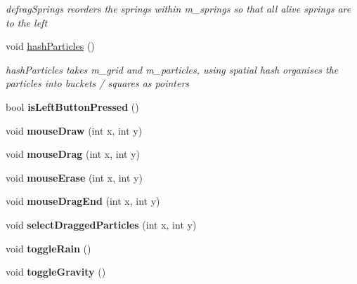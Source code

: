 \begin{DoxyCompactItemize}
\begin{DoxyCompactList}\small\item\em defrag\-Springs reorders the springs within m\-\_\-springs so that all alive springs are to the left \end{DoxyCompactList}\item 
\hypertarget{classWorld_ae27fe9607ae7b01b911568759862bbd5}{void \hyperlink{classWorld_ae27fe9607ae7b01b911568759862bbd5}{hash\-Particles} ()}\label{classWorld_ae27fe9607ae7b01b911568759862bbd5}

\begin{DoxyCompactList}\small\item\em hash\-Particles takes m\-\_\-grid and m\-\_\-particles, using spatial hash organises the particles into buckets / squares as pointers \end{DoxyCompactList}\item 
\hypertarget{classWorld_aae7e186e5bfedcc4c119346733de2a80}{bool {\bfseries is\-Left\-Button\-Pressed} ()}\label{classWorld_aae7e186e5bfedcc4c119346733de2a80}

\item 
\hypertarget{classWorld_a28f2d9a8e63dd01cca8dc7c102457fc6}{void {\bfseries mouse\-Draw} (int x, int y)}\label{classWorld_a28f2d9a8e63dd01cca8dc7c102457fc6}

\item 
\hypertarget{classWorld_a55549f4354974b87fc03759ce15ba7af}{void {\bfseries mouse\-Drag} (int x, int y)}\label{classWorld_a55549f4354974b87fc03759ce15ba7af}

\item 
\hypertarget{classWorld_a3a343bef6ff44293b3c394e50f711436}{void {\bfseries mouse\-Erase} (int x, int y)}\label{classWorld_a3a343bef6ff44293b3c394e50f711436}

\item 
\hypertarget{classWorld_aa2adabb735614bed42f0dcc6333e28b9}{void {\bfseries mouse\-Drag\-End} (int x, int y)}\label{classWorld_aa2adabb735614bed42f0dcc6333e28b9}

\item 
\hypertarget{classWorld_afb61fbb93e58ddda9acab26f67b2de26}{void {\bfseries select\-Dragged\-Particles} (int x, int y)}\label{classWorld_afb61fbb93e58ddda9acab26f67b2de26}

\item 
\hypertarget{classWorld_ae5cb0a8dd0696ed65284ce0e8560ddf5}{void {\bfseries toggle\-Rain} ()}\label{classWorld_ae5cb0a8dd0696ed65284ce0e8560ddf5}

\item 
\hypertarget{classWorld_aa8efd033209cbf9e0391f3adf1ddf4dc}{void {\bfseries toggle\-Gravity} ()}\label{classWorld_aa8efd033209cbf9e0391f3adf1ddf4dc}


\end{DoxyCompactItemize}
